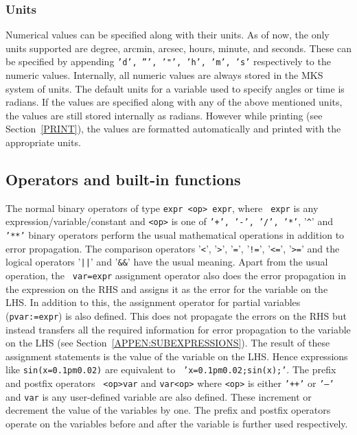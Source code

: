 \documentclass[11pt]{article}
\begin{document}
\subsubsection{Units}
\label{UNITS}
   
Numerical values can be specified along with their units.  As of now,
the only units supported are degree, arcmin, arcsec, hours, minute,
and seconds.  These can be specified by appending {\tt 'd', ''', '"',
'h', 'm', 's'} respectively to the numeric values.  Internally, all
numeric values are always stored in the MKS system of units.  The
default units for a variable used to specify angles or time is
radians.  If the values are specified along with any of the above
mentioned units, the values are still stored internally as radians.
However while printing (see Section~\ref{PRINT}), the values are
formatted automatically and printed with the appropriate units.

\subsection{Operators and built-in functions}

The normal binary operators of type {\tt expr <op> expr}, where {\tt
expr} is any expression/variable/constant and {\tt <op>} is one of
{\tt '+', '-', '/', '*'}, '{\texttt{\^}}' and {\tt '**'} binary
operators perform the usual mathematical operations in addition to
error propagation.  The comparison operators '{\texttt{<}}',
'{\texttt{>}}', '{\texttt{=}}', '{\texttt{!}}{\texttt{=}}',
'{\texttt{<}}{\texttt{=}}', '{\texttt{>}}{\texttt{=}}' and the logical
operators '{\texttt{|}}{\texttt{|}}' and '{\texttt{\&}}{\texttt{\&}}'
have the usual meaning.  Apart from the usual operation, the {\tt
var=expr} assignment operator also does the error propagation in the
expression on the RHS and assigns it as the error for the variable on
the LHS.  In addition to this, the assignment operator for partial
variables ({\tt pvar:=expr}) is also defined.  This does not propagate
the errors on the RHS but instead transfers all the required
information for error propagation to the variable on the LHS (see
Section~\ref{APPEN:SUBEXPRESSIONS}).  The result of these assignment
statements is the value of the variable on the LHS.  Hence expressions
like {\tt sin(x=0.1pm0.02)} are equivalent to {\tt
'x=0.1pm0.02;sin(x);'}.  The prefix and postfix operators {\tt
<op>var} and {\tt var<op>} where {\tt <op>} is either {\tt '++'} or
{\tt '--'} and {\tt var} is any user-defined variable are also
defined.  These increment or decrement the value of the variables by
one.  The prefix and postfix operators operate on the variables before
and after the variable is further used respectively.
\end{document}
